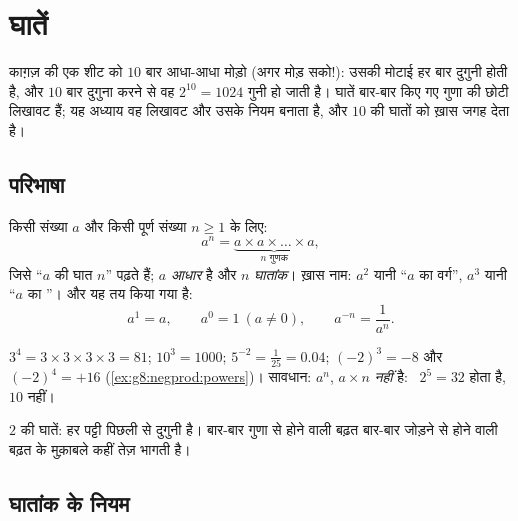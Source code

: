 \chapter{घातें}\label{ch:g8:powers}

काग़ज़ की एक शीट को $10$ बार आधा-आधा मोड़ो (अगर मोड़ सको!): उसकी
मोटाई हर बार दुगुनी होती है, और $10$ बार दुगुना करने से वह
$2^{10} = 1024$ गुनी हो जाती है। घातें बार-बार किए गए गुणा की
छोटी लिखावट हैं; यह अध्याय वह लिखावट और उसके नियम बनाता है, और $10$
की घातों को ख़ास जगह देता है।

\section{परिभाषा}

\begin{definition}[घात]\label{def:g8:powers:def}
किसी संख्या $a$ और किसी पूर्ण संख्या $n \geq 1$ के लिए:
\[
a^n = \underbrace{a \times a \times \dots \times a}_{n
\text{ गुणक}},
\]
जिसे ``$a$ की घात $n$'' पढ़ते हैं; $a$ \emph{आधार} है और $n$
\emph{घातांक}। ख़ास नाम: $a^2$ यानी ``$a$ का वर्ग'',
$a^3$ यानी ``$a$ का ''। और यह तय किया गया है:
\[
a^1 = a,
\qquad
a^0 = 1 \ (a \neq 0),
\qquad
a^{-n} = \frac{1}{a^n}.
\]
\end{definition}

\begin{example}\label{ex:g8:powers:def}
$3^4 = 3 \times 3 \times 3 \times 3 = 81$; \quad
$10^3 = 1000$; \quad $5^{-2} = \frac{1}{25} = 0.04$; \quad
$(-2)^3 = -8$ और $(-2)^4 = +16$
(\cref{ex:g8:negprod:powers})। सावधान: $a^n$, $a \times n$
\emph{नहीं} है: \ $2^5 = 32$ होता है, $10$ नहीं।
\end{example}

\begin{omfigure}

{\small $2$ की घातें: हर पट्टी पिछली से दुगुनी है। बार-बार गुणा से
होने वाली बढ़त बार-बार जोड़ने से होने वाली बढ़त के मुक़ाबले कहीं तेज़
भागती है।}
\end{omfigure}

\section{घातांक के नियम}

